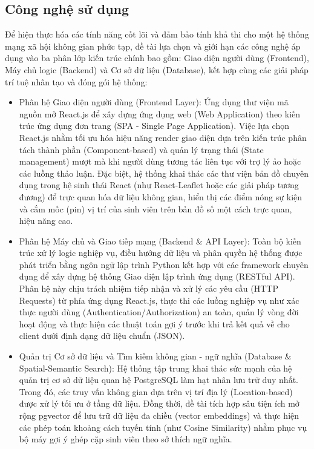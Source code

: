 \subsection{Công nghệ sử dụng}

Để hiện thực hóa các tính năng cốt lõi và đảm bảo tính khả thi cho một hệ thống mạng xã hội không gian phức tạp, đề tài lựa chọn và giới hạn các công nghệ áp dụng vào ba phân lớp kiến trúc chính bao gồm: Giao diện người dùng (Frontend), Máy chủ logic (Backend) và Cơ sở dữ liệu (Database), kết hợp cùng các giải pháp trí tuệ nhân tạo và đóng gói hệ thống:

\begin{itemize}
    \item Phân hệ Giao diện người dùng (Frontend Layer): Ứng dụng thư viện mã nguồn mở React.js để xây dựng ứng dụng web (Web Application) theo kiến trúc ứng dụng đơn trang (SPA - Single Page Application)\cite{banks2020react}. Việc lựa chọn React.js nhằm tối ưu hóa hiệu năng render giao diện dựa trên kiến trúc phân tách thành phần (Component-based) và quản lý trạng thái (State management) mượt mà khi người dùng tương tác liên tục với trợ lý ảo hoặc các luồng thảo luận. Đặc biệt, hệ thống khai thác các thư viện bản đồ chuyên dụng trong hệ sinh thái React (như React-Leaflet hoặc các giải pháp tương đương) để trực quan hóa dữ liệu không gian, hiển thị các điểm nóng sự kiện và cắm mốc (pin) vị trí của sinh viên trên bản đồ số một cách trực quan, hiệu năng cao.

    \item Phân hệ Máy chủ và Giao tiếp mạng (Backend \& API Layer): Toàn bộ kiến trúc xử lý logic nghiệp vụ, điều hướng dữ liệu và phân quyền hệ thống được phát triển bằng ngôn ngữ lập trình Python kết hợp với các framework chuyên dụng để xây dựng hệ thống Giao diện lập trình ứng dụng (RESTful API). Phân hệ này chịu trách nhiệm tiếp nhận và xử lý các yêu cầu (HTTP Requests) từ phía ứng dụng React.js, thực thi các luồng nghiệp vụ như xác thực người dùng (Authentication/Authorization) an toàn, quản lý vòng đời hoạt động và thực hiện các thuật toán gợi ý trước khi trả kết quả về cho client dưới định dạng dữ liệu chuẩn (JSON).
    
    \item Quản trị Cơ sở dữ liệu và Tìm kiếm không gian - ngữ nghĩa (Database \& Spatial-Semantic Search): Hệ thống tập trung khai thác sức mạnh của hệ quản trị cơ sở dữ liệu quan hệ PostgreSQL làm hạt nhân lưu trữ duy nhất. Trong đó, các truy vấn không gian dựa trên vị trí địa lý (Location-based) được xử lý tối ưu ở tầng dữ liệu. Đồng thời, đề tài tích hợp sâu tiện ích mở rộng pgvector để lưu trữ dữ liệu đa chiều (vector embeddings) và thực hiện các phép toán khoảng cách tuyến tính (như Cosine Similarity) nhằm phục vụ bộ máy gợi ý ghép cặp sinh viên theo sở thích ngữ nghĩa.
    

\end{itemize}
